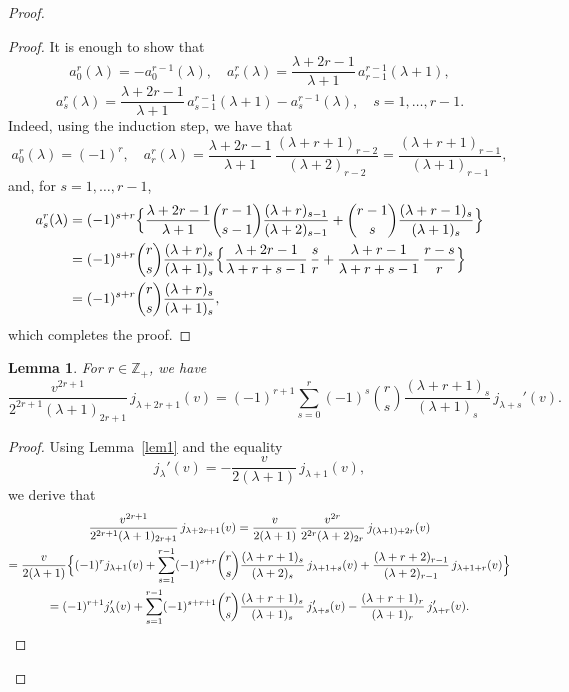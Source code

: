 \documentclass[12pt,twoside,reqno]{amsart}\usepackage[cp1251]{inputenc}
\theoremstyle{plain}
\newtheorem{lemma}[theorem]{Lemma}
\theoremstyle{remark}
\begin{document}
\begin{proof}
\begin{proof}
It is enough to show that
\[
a_{0}^{r}(\lambda)=-a_{0}^{r-1}(\lambda),\quad a_{r}^{r}(\lambda)=\frac{\lambda+2r-1}{\lambda+1}\,a_{r-1}^{r-1}(\lambda+1),
\]
\[
a_{s}^{r}(\lambda)=\frac{\lambda+2r-1}{\lambda+1}\,a_{s-1}^{r-1}(\lambda+1)-a_{s}^{r-1}(\lambda),\quad s=1,\dots,r-1.
\]
Indeed, using
the induction step, we have that
\[
a_{0}^{r}(\lambda)=%
(-1)^r,\quad a_{r}^{r}(\lambda)=\frac{\lambda+2r-1}{\lambda+1}\,\frac{(\lambda+r+1)_{r-2}}{(\lambda+2)_{r-2}}=
\frac{(\lambda+r+1)_{r-1}}{(\lambda+1)_{r-1}},
\]
and, for $s=1,\dots,r-1$,
\begin{align*}
a_s^r(\lambda)&=(-1)^{s+r}\Bigl\{\frac{\lambda+2r-1}{\lambda+1}
\binom{r-1}{s-1}\frac{(\lambda+r)_{s-1}}{(\lambda+2)_{s-1}}+\binom{r-1}{s}\frac{(\lambda+r-1)_{s}}{(\lambda+1)_{s}}\Bigr\}
\\
&=(-1)^{s+r}\binom{r}{s}\frac{(\lambda+r)_{s}}{(\lambda+1)_{s}}\Bigl\{\frac{\lambda+2r-1}{\lambda+r+s-1}\,\frac{s}{r}+
\frac{\lambda+r-1}{\lambda+r+s-1}\,\frac{r-s}{r}\Bigr\}
\\
&=(-1)^{s+r}\binom{r}{s}\frac{(\lambda+r)_{s}}{(\lambda+1)_{s}},
\end{align*}
which completes the proof.
\end{proof}

\begin{lemma}\label{lem2}
For $r\in\mathbb{Z}_{+}$, we have
\[
\frac{v^{2r+1}}{2^{2r+1}(\lambda+1)_{2r+1}}\,j_{\lambda+2r+1}(v)=(-1)^{r+1}\sum_{s=0}^{r}(-1)^{s}
\binom{r}{s}\frac{(\lambda+r+1)_{s}}{(\lambda+1)_{s}}\,j_{\lambda+s}'(v).
\]
\end{lemma}

\begin{proof}

 Using Lemma~\ref{lem1} and the equality
\[
j_{\lambda}'(v)=-\frac{v}{2(\lambda+1)}\,j_{\lambda+1}(v),
\]
we derive that
\begin{multline*}
\frac{v^{2r+1}}{2^{2r+1}(\lambda+1)_{2r+1}}\,j_{\lambda+2r+1}(v)=\frac{v}{2(\lambda+1)}\,
\frac{v^{2r}}{2^{2r}(\lambda+2)_{2r}}\,j_{(\lambda+1)+2r}(v)
\\
=
\frac{v}{2(\lambda+1)}\Bigl\{(-1)^{r}j_{\lambda+1}(v)+\sum_{s=1}^{r-1}(-1)^{s+r}
\binom{r}{s}\frac{(\lambda+r+1)_{s}}{(\lambda+2)_{s}}\,j_{\lambda+1+s}(v)+\frac{(\lambda+r+2)_{r-1}}{(\lambda+2)_{r-1}}\,j_{\lambda+1+r}(v)\Bigr\}
\\
=
(-1)^{r+1}j_{\lambda}'(v)+\sum_{s=1}^{r-1}(-1)^{s+r+1}
\binom{r}{s}\frac{(\lambda+r+1)_{s}}{(\lambda+1)_s}\,j_{\lambda+s}'(v)-\frac{(\lambda+r+1)_{r}}{(\lambda+1)_r}\,j_{\lambda+r}'(v).
\end{multline*}
\end{proof}


\end{proof}
\end{document}
